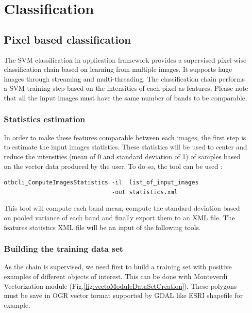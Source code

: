 \section{Classification}\label{sec:classification}

\subsection{Pixel based classification}\label{ssec:pbclassif}

The SVM classification in application framework provides a supervised pixel-wise
classification chain based on learning from multiple images. It supports huge
images through streaming and multi-threading.
The classification chain performs a SVM training step based on the intensities
of each pixel as features. Please note that all the input images must have the
same number of bands to be comparable.

\subsubsection{Statistics estimation}
In order to make these features comparable between each images, the first step
is to estimate the input images statistics. These statistics will be used to
center and reduce the intensities (mean of 0 and standard deviation of 1) of
samples based on the vector data produced by the user. To do so, the
 tool can be used :

\begin{verbatim}
otbcli_ComputeImagesStatistics -il  list_of_input_images
                               -out statistics.xml
\end{verbatim}

This tool will compute each band mean, compute the standard deviation based on
pooled variance of each band and finally export them to an XML file.
The features statistics XML file will be an input of the following tools.

\subsubsection{Building the training data set}

As the chain is supervised, we need first to build a training set with
positive examples of different objects of interest. This can be done
with Monteverdi Vectorization module
(Fig.\ref{fig:vectoModuleDataSetCreation}).
These polygons must be save in OGR vector format supported
by GDAL like ESRI shapefile for example.

